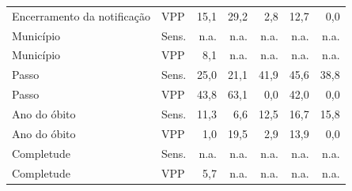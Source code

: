 \begin{table}[htbp]
{\begin{tabular}{llrrrrr}
Encerramento da notifica\c{c}\~ao & VPP & 15{,}1 & 29{,}2 & 2{,}8 & 12{,}7 & 0{,}0 \\
Munic\'ipio & Sens. & n.a. & n.a. & n.a. & n.a. & n.a. \\
Munic\'ipio & VPP & 8{,}1 & n.a. & n.a. & n.a. & n.a. \\
Passo & Sens. & 25{,}0 & 21{,}1 & 41{,}9 & 45{,}6 & 38{,}8 \\
Passo & VPP & 43{,}8 & 63{,}1 & 0{,}0 & 42{,}0 & 0{,}0 \\
Ano do \'obito & Sens. & 11{,}3 & 6{,}6 & 12{,}5 & 16{,}7 & 15{,}8 \\
Ano do \'obito & VPP & 1{,}0 & 19{,}5 & 2{,}9 & 13{,}9 & 0{,}0 \\
Completude & Sens. & n.a. & n.a. & n.a. & n.a. & n.a. \\
Completude & VPP & 5{,}7 & n.a. & n.a. & n.a. & n.a. \\
\bottomrule
\end{tabular}}
\end{table}
